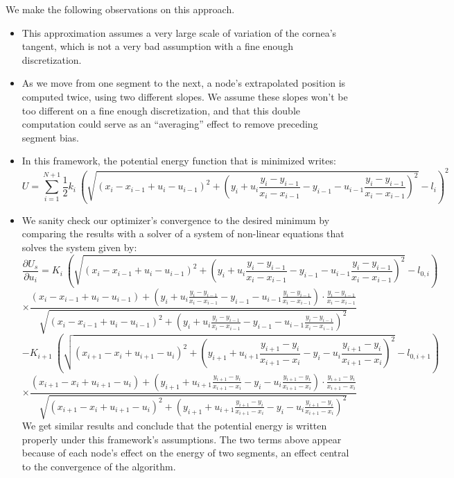 \documentclass[epjST]{svjour}
\begin{document}
We make the following observations on this approach.
\begin{itemize}
    \item This approximation assumes a very large scale of variation of the cornea's tangent, which is not a very bad assumption with a fine enough discretization.
    \\\item As we move from one segment to the next, a node's extrapolated position is computed twice, using two different slopes. We assume these slopes won't be too different on a fine enough discretization, and that this double computation could serve as an ``averaging'' effect to remove preceding segment bias.
    \\\item In this framework, the potential energy function that is minimized writes:
    \[
    U = \sum_{i=1}^{N+1} \frac{1}{2}k_i \: \left(\sqrt{(x_i-x_{i-1} + u_i-u_{i-1})^2+\left(y_i+u_i \frac{y_i-y_{i-1}}{x_i-x_{i-1}}-y_{i-1}-u_{i-1} \frac{y_i-y_{i-1}}{x_i-x_{i-1}}\right)^2}-l_{i}\right)^2
    \]
    \item We sanity check our optimizer's convergence to the desired minimum by comparing the results with a solver of a system of non-linear equations that solves the system given by:
    \[
    \frac{\partial U_s}{\partial u_i} = K_i \: \left(\sqrt{(x_i-x_{i-1} + u_i-u_{i-1})^2+\left(y_i+u_i \frac{y_i-y_{i-1}}{x_i-x_{i-1}}-y_{i-1}-u_{i-1} \frac{y_i-y_{i-1}}{x_i-x_{i-1}}\right)^2}-l_{0,i}\right)
    \]
    \[
    \times
\frac{(x_i-x_{i-1}+u_i-u_{i-1})+\left(y_i+u_i \frac{y_i-y_{i-1}}{x_i-x_{i-1}}-y_{i-1}-u_{i-1} \frac{y_i-y_{i-1}}{x_i-x_{i-1}}\right)\cdot \frac{y_i-y_{i-1}}{x_i-x_{i-1}} }{\sqrt{(x_i-x_{i-1} + u_i-u_{i-1})^2+\left(y_i+u_i \frac{y_i-y_{i-1}}{x_i-x_{i-1}}-y_{i-1}-u_{i-1} \frac{y_i-y_{i-1}}{x_i-x_{i-1}}\right)^2}}
    \]
    \[
    -K_{i+1} \: \left(\sqrt{(x_{i+1}-x_{i} + u_{i+1}-u_{i})^2+\left(y_{i+1}+u_{i+1} \frac{y_{i+1}-y_{i}}{x_{i+1}-x_{i}}-y_{i}-u_{i} \frac{y_{i+1}-y_{i}}{x_{i+1}-x_{i}}\right)^2}-l_{0,i+1}\right)
    \]
    \[
    \times
\frac{(x_{i+1}-x_{i}+u_{i+1}-u_{i})+\left(y_{i+1}+u_{i+1} \frac{y_{i+1}-y_{i}}{x_{i+1}-x_{i}}-y_{i}-u_{i} \frac{y_{i+1}-y_{i}}{x_{i+1}-x_{i}}\right)\cdot \frac{y_{i+1}-y_{i}}{x_{i+1}-x_{i}} }{\sqrt{(x_{i+1}-x_{i} + u_{i+1}-u_{i})^2+\left(y_{i+1}+u_{i+1} \frac{y_{i+1}-y_{i}}{x_{i+1}-x_{i}}-y_{i}-u_{i} \frac{y_{i+1}-y_{i}}{x_{i+1}-x_{i}}\right)^2}}
    \]
    We get similar results and conclude that the potential energy is written properly under this framework's assumptions. The two terms above appear because of each node's effect on the energy of two segments, an effect central to the convergence of the algorithm.
\end{itemize}
\end{document}
